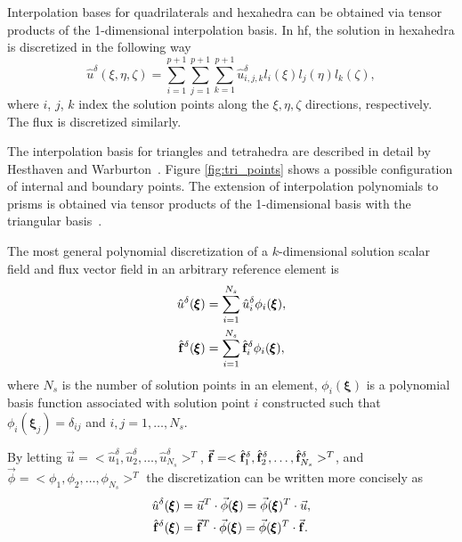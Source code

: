 Interpolation bases for quadrilaterals and hexahedra can be obtained via tensor products of the 1-dimensional interpolation basis. In \gls{hf}, the solution in hexahedra is discretized in the following way
\begin{equation}
{\hat{u}}^\delta(\xi,\eta,\zeta) = \sum_{i=1}^{p+1} \sum_{j=1}^{p+1} \sum_{k=1}^{p+1}
{\hat{u}}^\delta_{i,j,k} l_i(\xi) l_j(\eta) l_k(\zeta),
\end{equation}
where $i$, $j$, $k$ index the solution points along the $\xi, \eta, \zeta$ directions, respectively. The flux is discretized similarly.

The interpolation basis for triangles and tetrahedra are described in detail by Hesthaven and Warburton~\cite{hesthaven2007nodal}. Figure \ref{fig:tri_points} shows a possible configuration of internal and boundary points. The extension of interpolation polynomials to prisms is obtained via tensor products of the 1-dimensional basis with the triangular basis~\cite{castonguay2011}. 

The most general polynomial discretization of a $k$-dimensional solution scalar field and flux vector field in an arbitrary reference element is
\begin{align}
\label{eqn:general_u}
\hat{u}^\delta({\pmb \xi}) &= \sum_{i=1}^{N_s} \hat{u}_i^\delta {\phi}_i({\pmb \xi}),\\
\hat{\bf f}^\delta({\pmb \xi}) &= \sum_{i=1}^{N_s} \hat{\bf f}_i^\delta {\phi}_i({\pmb \xi}),
\end{align}
where $N_s$ is the number of solution points in an element, ${\phi}_i({\pmb \xi})$ is a polynomial basis function associated with solution point $i$ constructed such that ${\phi}_i({\pmb \xi}_j) = \delta_{ij}$ and $i,j = 1,\dots,N_s$.

By letting $\vec{u} = <\hat{u}_1^\delta, \hat{u}_2^\delta,\dots,\hat{u}_{N_s}^\delta>^T $, $\vec{\bf f} = <\hat{\bf f}_1^\delta, \hat{\bf f}_2^\delta,\dots,\hat{\bf f}_{N_s}^\delta>^T $, and 
$\vec{\phi} = <\phi_1,\phi_2,\dots,\phi_{N_s}>^T$ the discretization can be written more concisely as
\begin{equation}
\begin{split}
\hat{u}^\delta({\pmb \xi}) &= \vec{u}^T \cdot \vec{\phi}({\pmb \xi}) =  \vec{\phi}({\pmb \xi})^T\cdot \vec{u},\\
\hat{\bf f}^\delta({\pmb \xi}) &= \vec{\bf f}^T \cdot \vec{\phi}({\pmb \xi}) = \vec{\phi}({\pmb \xi})^T \cdot \vec{\bf f}.
\end{split}
\end{equation}

